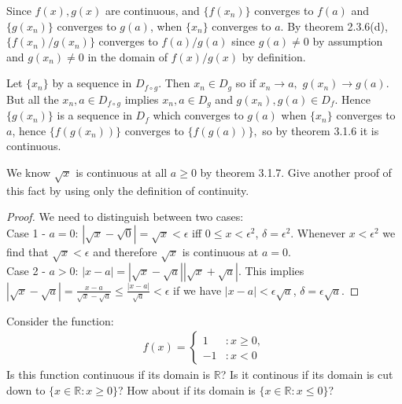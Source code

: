 \documentclass[12pt]{book}
\newcommand{\R}{\mathbb{R}}
\newenvironment{exercise}[2][Exercise]{\begin{trivlist}
\item[\hskip \labelsep {\bfseries #1}\hskip \labelsep {\bfseries #2.}]}{\end{trivlist}}
\begin{document}
\begin{exercise}{3.1.6}
Since $f(x), g(x)$ are continuous, and $\{f(x_n)\}$ converges to $f(a)$ and $\{g(x_n)\}$ converges to $g(a)$, when $\{x_n\}$ converges to $a$. By theorem 2.3.6(d), $\{f(x_n)/g(x_n)\}$ converges to $f(a)/g(a)$ since $g(a) \neq 0$ by assumption and $g(x_n) \neq 0$ in the domain of $f(x)/g(x)$ by definition. 
\end{exercise}

\begin{exercise}{3.1.7} Let $\{x_n\}$ by a sequence in $D_{f \circ g}$. Then $x_n \in D_g$ so if $x_n \rightarrow a,$ $g(x_n) \rightarrow g(a)$. But all the $x_n, a \in D_{f \circ g}$ implies $x_n, a \in D_g$ and $g(x_n), g(a) \in D_f.$ Hence $\{g(x_n)\}$ is a sequence in $D_f$ which converges to $g(a)$ when $\{x_n\}$ converges to $a$, hence $\{f(g(x_n))\}$ converges to $\{f(g(a))\},$ so by theorem 3.1.6 it is continuous. 
\end{exercise}

\begin{exercise}{3.1.8}
    We know $\sqrt{x}$ is continuous at all $a \geq 0$ by theorem 3.1.7. Give another proof of this fact by using only the definition of continuity. 
    
    \begin{proof}
    We need to distinguish between two cases: \\
    Case 1 - $a= 0$: $|\sqrt{x} - \sqrt{0}| = \sqrt{x} < \epsilon$ iff $0 \leq x < \epsilon^2$, $\delta=\epsilon^2$. Whenever $x<\epsilon^2$ we find that $\sqrt{x}< \epsilon$ and therefore $\sqrt{x}$ is continuous at $a=0$. \\
    Case 2 - $a>0$: $|x-a|=|\sqrt{x}-\sqrt{a}| |\sqrt{x}+\sqrt{a}|$. This implies $|\sqrt{x}-\sqrt{a}| = \frac{x-a}{\sqrt{x}-\sqrt{a}} \leq \frac{|x-a|}{\sqrt{a}} < \epsilon$ if we have $|x-a| < \epsilon \sqrt{a}$, $\delta=\epsilon \sqrt{a}$.
    \end{proof}
\end{exercise}

\begin{exercise}{3.1.9}
Consider the function:
	\begin{align*}
	f(x) = \left\{
     \begin{array}{lr}
       1 & : x \geq 0,\\
       -1 & : x < 0
     \end{array}
   \right.
	\end{align*}
Is this function continuous if its domain is $\R$? Is it continous if its domain is cut down to $\{ x\in \R: x \geq 0 \}$? How about if its domain is $\{x \in \R : x \leq 0 \}$?
\end{exercise}
\end{document}
